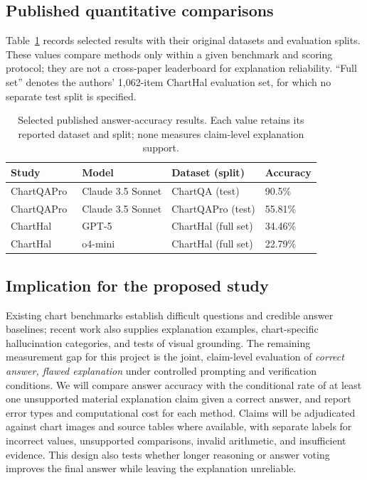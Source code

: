\subsection{Published quantitative comparisons}

Table~\ref{tab:sota-results} records selected results with their original datasets and evaluation splits. These values compare methods only within a given benchmark and scoring protocol; they are not a cross-paper leaderboard for explanation reliability. ``Full set'' denotes the authors' 1,062-item ChartHal evaluation set, for which no separate test split is specified.

\begin{table}[htbp]
\centering
\small
\caption{Selected published answer-accuracy results. Each value retains its
reported dataset and split; none measures claim-level explanation support.}
\label{tab:sota-results}
\begin{tabular}{llll}
\hline
Study & Model & Dataset (split) & Accuracy \\
\hline
ChartQAPro~\cite{masry2025chartqapro} & Claude 3.5 Sonnet & ChartQA (test) & 90.5\% \\
ChartQAPro~\cite{masry2025chartqapro} & Claude 3.5 Sonnet & ChartQAPro (test) & 55.81\% \\
ChartHal~\cite{wang2025charthal} & GPT-5 & ChartHal (full set) & 34.46\% \\
ChartHal~\cite{wang2025charthal} & o4-mini & ChartHal (full set) & 22.79\% \\
\hline
\end{tabular}
\end{table}

\subsection{Implication for the proposed study}

Existing chart benchmarks establish difficult questions and credible answer baselines; recent work also supplies explanation examples, chart-specific hallucination categories, and tests of visual grounding. The remaining measurement gap for this project is the joint, claim-level evaluation of \emph{correct answer, flawed explanation} under controlled prompting and verification conditions. We will compare answer accuracy with the conditional rate of at least one unsupported material explanation claim given a correct answer, and report error types and computational cost for each method. Claims will be adjudicated against chart images and source tables where available, with separate labels for incorrect values, unsupported comparisons, invalid arithmetic, and insufficient evidence. This design also tests whether longer reasoning or answer voting improves the final answer while leaving the explanation unreliable.



